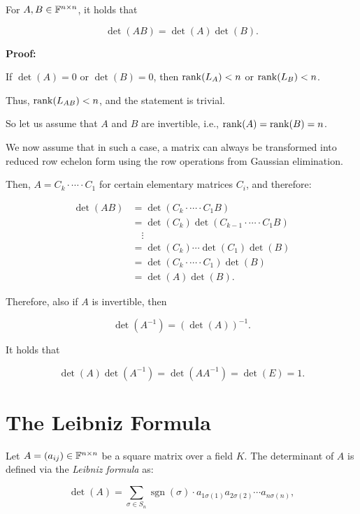 For \( A, B \in \mathbb{F}^{n \times n} \), it holds that

\[
    \det(AB) = \det(A)\det(B).
\]

\textbf{Proof:}

If \( \det(A) = 0 \) or \( \det(B) = 0 \), then \( \mathrm{rank}(L_A) < n \) or \( \mathrm{rank}(L_B) < n \).

Thus, \( \mathrm{rank}(L_{AB}) < n \), and the statement is trivial.

So let us assume that \(A\) and \(B\) are invertible, i.e., \( \mathrm{rank}(A) = \mathrm{rank}(B) = n \).

We now assume that in such a case, a matrix can always be transformed into reduced row echelon form using the row operations 
from Gaussian elimination.

Then, \( A = C_k \cdot \cdots \cdot C_1 \) for certain elementary matrices \( C_i \), and therefore:

\begin{align*}
    \det(AB) & = \det(C_k \cdot \cdots \cdot C_1 B)              \\
             & = \det(C_k)\det(C_{k-1} \cdot \cdots \cdot C_1 B) \\
             & \quad \vdots                                      \\
             & = \det(C_k) \cdots \det(C_1)\det(B)               \\
             & = \det(C_k \cdot \cdots \cdot C_1)\det(B)         \\
             & = \det(A)\det(B).
\end{align*}

Therefore, also if \(A\) is invertible, then

\[
    \det(A^{-1}) = {(\det(A))}^{-1}.
\]

It holds that

\[
    \det(A)\det(A^{-1}) = \det(AA^{-1}) = \det(E) = 1.
\]

\QED

\section{The Leibniz Formula}

Let \( A = (a_{ij}) \in \mathbb{F}^{n \times n} \) be a square matrix over a field \( K \). The determinant of \(A\) is defined via the 
\emph{Leibniz formula} as:

\[
    \det(A) = \sum_{\sigma \in S_n} \operatorname{sgn}(\sigma) \cdot a_{1\sigma(1)} a_{2\sigma(2)} \cdots a_{n\sigma(n)},
\]

